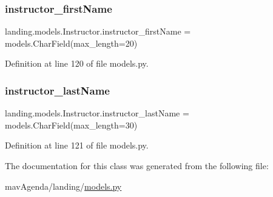 \subsubsection{\texorpdfstring{instructor\+\_\+first\+Name}{instructor\_firstName}}
{\footnotesize\ttfamily landing.\+models.\+Instructor.\+instructor\+\_\+first\+Name = models.\+Char\+Field(max\+\_\+length=20)\hspace{0.3cm}{\ttfamily [static]}}



Definition at line 120 of file models.\+py.

\mbox{\label{classlanding_1_1models_1_1Instructor_a180b4ad797ed2552ab12d29699c56ca6}} 
\subsubsection{\texorpdfstring{instructor\+\_\+last\+Name}{instructor\_lastName}}
{\footnotesize\ttfamily landing.\+models.\+Instructor.\+instructor\+\_\+last\+Name = models.\+Char\+Field(max\+\_\+length=30)\hspace{0.3cm}{\ttfamily [static]}}



Definition at line 121 of file models.\+py.



The documentation for this class was generated from the following file\+:\begin{DoxyCompactItemize}
\item 
mav\+Agenda/landing/\mbox{\hyperlink{models_8py}{models.\+py}}\end{DoxyCompactItemize}
